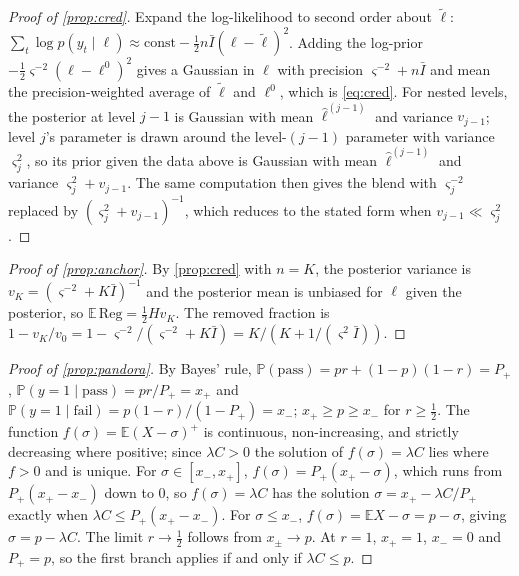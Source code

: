 \documentclass[11pt,a4paper]{article}
\theoremstyle{definition}
\theoremstyle{remark}
\theoremstyle{definition}
\newcommand{\E}{\mathbb{E}}
\renewcommand{\Pr}{\mathbb{P}}
\begin{document}
\begin{proof}[Proof of \cref{prop:cred}]
Expand the log-likelihood to second order about $\tilde\ell$: $\sum_t\log p(y_t\mid\ell)\approx\mathrm{const}-\tfrac12 n\bar I(\ell-\tilde\ell)^2$. Adding the log-prior $-\tfrac12 \varsigma^{-2}(\ell-\ell^0)^2$ gives a Gaussian in $\ell$ with precision $\varsigma^{-2}+n\bar I$ and mean the precision-weighted average of $\tilde\ell$ and $\ell^0$, which is \eqref{eq:cred}. For nested levels, the posterior at level $j-1$ is Gaussian with mean $\hat\ell^{(j-1)}$ and variance $v_{j-1}$; level $j$'s parameter is drawn around the level-$(j-1)$ parameter with variance $\varsigma_j^2$, so its prior given the data above is Gaussian with mean $\hat\ell^{(j-1)}$ and variance $\varsigma_j^2+v_{j-1}$. The same computation then gives the blend with $\varsigma_j^{-2}$ replaced by $(\varsigma_j^2+v_{j-1})^{-1}$, which reduces to the stated form when $v_{j-1}\ll\varsigma_j^2$.
\end{proof}

\begin{proof}[Proof of \cref{prop:anchor}]
By \cref{prop:cred} with $n=K$, the posterior variance is $v_K=(\varsigma^{-2}+K\bar I)^{-1}$ and the posterior mean is unbiased for $\ell$ given the posterior, so $\E\,\mathrm{Reg}=\tfrac12 H v_K$. The removed fraction is $1-v_K/v_0=1-\varsigma^{-2}/(\varsigma^{-2}+K\bar I)=K/(K+1/(\varsigma^2\bar I))$.
\end{proof}

\begin{proof}[Proof of \cref{prop:pandora}]
By Bayes' rule, $\Pr(\text{pass})=pr+(1-p)(1-r)=P_+$, $\Pr(y=1\mid\text{pass})=pr/P_+=x_+$ and $\Pr(y=1\mid\text{fail})=p(1-r)/(1-P_+)=x_-$; $x_+\ge p\ge x_-$ for $r\ge\tfrac12$. The function $f(\sigma)=\E(X-\sigma)^+$ is continuous, non-increasing, and strictly decreasing where positive; since $\lambda C>0$ the solution of $f(\sigma)=\lambda C$ lies where $f>0$ and is unique. For $\sigma\in[x_-,x_+]$, $f(\sigma)=P_+(x_+-\sigma)$, which runs from $P_+(x_+-x_-)$ down to 0, so $f(\sigma)=\lambda C$ has the solution $\sigma=x_+-\lambda C/P_+$ exactly when $\lambda C\le P_+(x_+-x_-)$. For $\sigma\le x_-$, $f(\sigma)=\E X-\sigma=p-\sigma$, giving $\sigma=p-\lambda C$. The limit $r\to\tfrac12$ follows from $x_\pm\to p$. At $r=1$, $x_+=1$, $x_-=0$ and $P_+=p$, so the first branch applies if and only if $\lambda C\le p$.
\end{proof}
\end{document}
